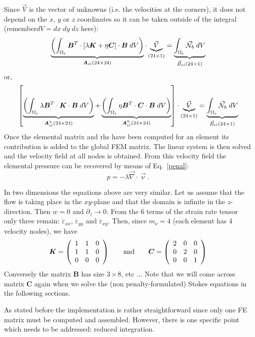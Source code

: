 Since $\vec V$ is the vector of unknowns (i.e. the velocities at the corners), 
it does not depend on the $x$, $y$ or $z$ coordinates
so it can be taken outside of the integral (remember$dV=dx\; dy\; dz$ here):
\[
\underbrace{
\left(\int_{\Omega_e} {\bm B}^T \cdot [ \lambda {\bm K} + \eta {\bm C} ] \cdot {\bm B} \;  dV \right) 
}_{\bm A_{el}(24 \times 24)}
\cdot 
\underbrace{
{\vec V}
}_{(24\times 1)}
=
\underbrace{
\int_{\Omega_e} {\vec {{\mathcal{N}}}}_b \; dV
}_{\vec B_{el} (24\times 1)}
\]
or, 
\[
\left[
\underbrace{
\left(\int_{\Omega_e} \lambda {\bm B}^T \cdot {\bm K} \cdot {\bm B} \; dV \right) 
}_{\bm A_{el}^\lambda(24 \times 24)}
+
\underbrace{
\left(\int_{\Omega_e}  \eta {\bm B}^T \cdot {\bm C}  \cdot {\bm B} \;  dV \right) 
}_{\bm A_{el}^\eta(24 \times 24)}
\right]
\cdot 
\underbrace{
{\vec V}
}_{(24\times 1)}
=
\underbrace{
\int_{\Omega_e} {\vec {{\mathcal{N}}}}_b \; dV
}_{\vec B_{el} (24\times 1)}
\]
Once the elemental matrix and rhs have been computed for an element
its contribution is added to the global FEM matrix. 
The linear system is then solved and the velocity field at all nodes 
is obtained. 
From this velocity field the elemental pressure can be recovered by means of 
Eq.~\eqref{penal}: 
\[
p = -\lambda \vec\nabla\cdot\vec\upnu.
\]



In two dimensions the equations above are very similar. Let us assume that the 
flow is taking place in the $xy$-plane and that the domain is infinite in the 
$z$-direction. Then $w=0$ and $\partial_z \rightarrow 0$. From the 6 terms
of the strain rate tensor only three remain: 
$\dot\varepsilon_{xx}$, $\dot\varepsilon_{yy}$ and $\dot\varepsilon_{xy}$.
Then, since $m_\upnu=4$ (each element has 4 velocity nodes), we have 
\[
{\bm K}=
\left(
\begin{array}{ccc}
1 & 1 & 0 \\
1 & 1 & 0 \\
0 & 0 & 0 \\
\end{array}
\right)
\qquad
{\rm and}
\qquad
{\bm C} = 
\left(
\begin{array}{ccc}
2 & 0 & 0 \\ 
0 & 2 & 0 \\
0 & 0 & 1 
\end{array}
\right)
\]
Conversely the matrix ${\bm B}$ has size $3\times 8$, etc ...  
Note that we will come across matrix ${\bm C}$ again when we solve the (non penalty-formulated) Stokes equations 
in the following sections.

As stated before the implementation is rather straightforward since only one FE matrix must be computed 
and assembled. However, there is one specific point which needs to be addressed: reduced integration.

